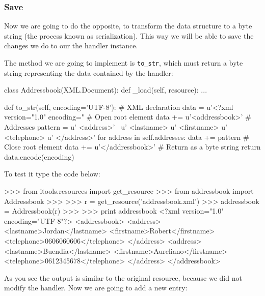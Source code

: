 \subsubsection{Save}

Now we are going to do the opposite, to transform the data structure to
a byte string (the process known as serialization). This way we will be
able to save the changes we do to our the handler instance.

The method we are going to implement is {\tt to\_str}, which must return
a byte string representing the data contained by the handler:

\begin{code}
    class Addressbook(XML.Document):
        def _load(self, resource):
            ...


        def to_str(self, encoding='UTF-8'):
            # XML declaration
            data = u'<?xml version="1.0" encoding="%
            # Open root element
            data += u'<addressbook>\n'
            # Addresses
            pattern = u'  <address>\n' \
                      u'    <lastname>%
                      u'    <firstname>%
                      u'    <telephone>%
                      u'  </address>\n'
            for address in self.addresses:
                data += pattern %
            # Close root element
            data += u'</addressbook>'
            # Return as a byte string
            return data.encode(encoding)
\end{code}

To test it type the code below:

\begin{code}
    >>> from itools.resources import get_resource
    >>> from addressbook import Addressbook
    >>>
    >>> r = get_resource('addressbook.xml')
    >>> addressbook = Addressbook(r)
    >>>
    >>> print addressbook
    <?xml version="1.0" encoding="UTF-8"?>
    <addressbook>
      <address>
        <lastname>Jordan</lastname>
        <firstname>Robert</firstname>
        <telephone>0606060606</telephone>
      </address>
      <address>
        <lastname>Buendia</lastname>
        <firstname>Aureliano</firstname>
        <telephone>0612345678</telephone>
      </address>
    </addressbook>
\end{code}

As you see the output is similar to the original resource, because we did not
modify the handler. Now we are going to add a new entry:

